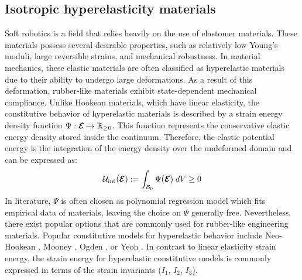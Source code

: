 \subsection{Isotropic hyperelasticity materials}
Soft robotics is a field that relies heavily on the use of elastomer materials. These materials possess several desirable properties, such as relatively low Young's moduli, large reversible strains, and mechanical robustness. In material mechanics, these elastic materials are often classified as hyperelastic materials due to their ability to undergo large deformations. As a result of this deformation, rubber-like materials exhibit state-dependent mechanical compliance. Unlike Hookean materials, which have linear elasticity, the constitutive behavior of hyperelastic materials is described by a strain energy density function ${\Psi}: \boldsymbol{\mathcal{E}} \mapsto \mathbb{R}_{\ge0}$. This function represents the conservative elastic energy density stored inside the continuum. Therefore, the elastic potential energy is the integration of the energy density over the undeformed domain and can be expressed as:
%
\begin{equation}
\mathcal{U}_{\textrm{int}}(\boldsymbol{\mathcal{E}}):= \int_{\mathcal{B}_0} \Psi(\boldsymbol{\mathcal{E}})\; dV \ge 0
\end{equation}
%
In literature, $\Psi$ is often chosen as polynomial regression model which fits empirical data of materials, leaving the choice on $\Psi$ generally free. Nevertheless, there exist popular options that are commonly used for rubber-like engineering materials. Popular constitutive models for hyperelastic behavior include Neo-Hookean \cite{Smith2018,Bern2019,Bern2021Apr}, Mooney \cite{Kim2018}, Ogden \cite{Xavier2022Jun}, or Yeoh \cite{Renaud2011}. In contrast to linear elasticity strain energy, the strain energy for hyperelastic constitutive models is commonly expressed in terms of the strain invariants (${I}_1$, ${I}_2$, ${I}_3$).

